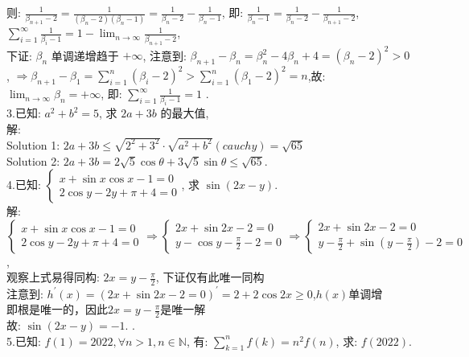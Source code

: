 \documentclass[a4paper,11pt,UTF8]{article}
\begin{document}
则: $\displaystyle\frac{1}{\beta_{n+1}-2}=\frac{1}{\left(\beta_n-2\right)\left(\beta_n-1\right)}=\frac{1}{\beta_n-2}-\frac{1}{\beta_n-1}$, 即: $\displaystyle\frac{1}{\beta_n-1}=\frac{1}{\beta_n-2}-\frac{1}{\beta_{n+1}-2}$, $\displaystyle\sum_{i=1}^{\infty} \frac{1}{\beta_i-1}=1-\lim _{n \rightarrow \infty} \frac{1}{\beta_{n+1}-2}$,\\
下证: $\beta_n$ 单调递增趋于 $+\infty$, 注意到: $\beta_{n+1}-\beta_n=\beta_n^2-4 \beta_n+4=\left(\beta_n-2\right)^2>0$, $\displaystyle\Rightarrow\beta_{n+1}-\beta_1=\sum_{i=1}^n(\beta_i-2)^2>\sum_{i=1}^n(\beta_1-2)^2=n$,故: $\displaystyle\lim _{n \rightarrow \infty} \beta_n=+\infty$, 即: $\displaystyle\sum_{i=1}^{\infty} \frac{1}{\beta_i-1}=1$ .\\
3.已知: $a^2+b^2=5$, 求 $2 a+3 b$ 的最大值,\\
解:\\
Solution 1: $2 a+3 b \leq \sqrt{2^2+3^2} \cdot \sqrt{a^2+b^2}( cauchy )=\sqrt{65}$\\
Solution 2: $2 a+3 b = 2\sqrt{5}\cos\theta+3\sqrt{5}\sin\theta\leq\sqrt{65}$. \\
4.已知: $\left\{\begin{array}{l}x+\sin x \cos x-1=0 \\ 2 \cos y-2 y+\pi+4=0\end{array}\right.$, 求 $\sin (2 x-y)$.\\
解: $\left\{\begin{array}{l}x+\sin x \cos x-1=0 \\ 2 \cos y-2 y+\pi+4=0\end{array} \displaystyle\Rightarrow \left\{\begin{array}{l}2x+ \sin 2 x-2=0\\\displaystyle y-\cos y-\frac{\pi}{2}-2=0\end{array}\right.\right.\displaystyle\Rightarrow \left\{\begin{array}{l}2x+ \sin 2 x-2=0\\\displaystyle y-\frac{\pi}{2}+\sin (y-\frac{\pi}{2})-2=0\end{array}\right.$,\\
观察上式易得同构:  $\displaystyle2 x=y-\frac{\pi}{2}$, 下证仅有此唯一同构\\
注意到: $h^{\prime}(x)=(2x+ \sin 2 x-2=0)^{\prime}=2+2\cos 2x \geq 0$,$h(x)$单调增\\
即根是唯一的，因此$\displaystyle2 x=y-\frac{\pi}{2}$是唯一解\\
故: $\sin (2 x-y)=-1$. .\\
5.已知: $f(1)=2022, \forall n>1, n \in \mathbb{N}$, 有: $\displaystyle\sum_{k=1}^n f(k)=n^2 f(n)$, 求: $f(2022)$.\\
\end{document}

